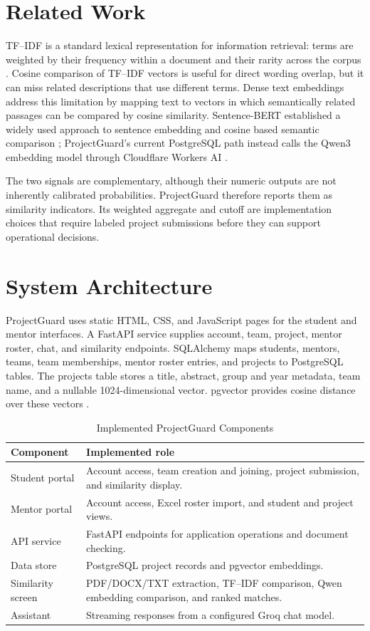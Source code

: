\documentclass[conference]{IEEEtran}
\begin{document}
\section{Related Work}
TF--IDF is a standard lexical representation for information retrieval: terms are weighted by their frequency within a document and their rarity across the corpus \cite{salton1988}. Cosine comparison of TF--IDF vectors is useful for direct wording overlap, but it can miss related descriptions that use different terms. Dense text embeddings address this limitation by mapping text to vectors in which semantically related passages can be compared by cosine similarity. Sentence-BERT established a widely used approach to sentence embedding and cosine based semantic comparison \cite{reimers2019}; ProjectGuard's current PostgreSQL path instead calls the Qwen3 embedding model through Cloudflare Workers AI \cite{qwen3embedding,cloudflareqwen}.

The two signals are complementary, although their numeric outputs are not inherently calibrated probabilities. ProjectGuard therefore reports them as similarity indicators. Its weighted aggregate and cutoff are implementation choices that require labeled project submissions before they can support operational decisions.

\section{System Architecture}
ProjectGuard uses static HTML, CSS, and JavaScript pages for the student and mentor interfaces. A FastAPI service supplies account, team, project, mentor roster, chat, and similarity endpoints. SQLAlchemy maps students, mentors, teams, team memberships, mentor roster entries, and projects to PostgreSQL tables. The projects table stores a title, abstract, group and year metadata, team name, and a nullable 1024-dimensional vector. pgvector provides cosine distance over these vectors \cite{pgvector}.

\begin{table}[t]
\caption{Implemented ProjectGuard Components}
\label{tab:components}
\centering
\footnotesize
\begin{tabular}{p{}p{}}
\hline
Component & Implemented role \\
\hline
Student portal & Account access, team creation and joining, project submission, and similarity display. \\
Mentor portal & Account access, Excel roster import, and student and project views. \\
API service & FastAPI endpoints for application operations and document checking. \\
Data store & PostgreSQL project records and pgvector embeddings. \\
Similarity screen & PDF/DOCX/TXT extraction, TF--IDF comparison, Qwen embedding comparison, and ranked matches. \\
Assistant & Streaming responses from a configured Groq chat model. \\
\hline
\end{tabular}
\end{table}
\end{document}
